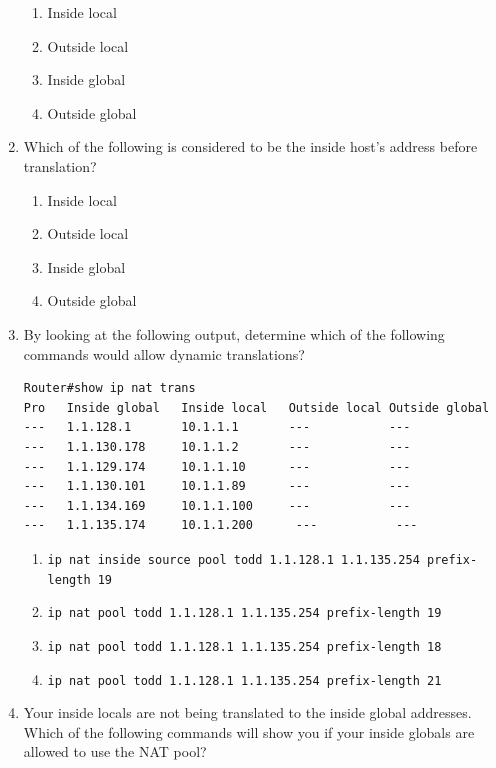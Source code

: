 \documentclass[b5paper,11pt]{memoir}
\begin{document}
\begin{enumerate}
  \begin{enumerate}
  \tightlist
  \item
    Inside local
  \item
    Outside local
  \item
    Inside global
  \item
    Outside global
  \end{enumerate}
\item
  Which of the following is considered to be the inside host's address
  before translation?

  \begin{enumerate}
  \tightlist
  \item
    Inside local
  \item
    Outside local
  \item
    Inside global
  \item
    Outside global
  \end{enumerate}
\item
  By looking at the following output, determine which of the following
  commands would allow dynamic translations?

\begin{verbatim}
Router#show ip nat trans
Pro   Inside global   Inside local   Outside local Outside global
---   1.1.128.1       10.1.1.1       ---           ---
---   1.1.130.178     10.1.1.2       ---           ---
---   1.1.129.174     10.1.1.10      ---           ---
---   1.1.130.101     10.1.1.89      ---           ---
---   1.1.134.169     10.1.1.100     ---           ---
---   1.1.135.174     10.1.1.200      ---           ---
\end{verbatim}

  \begin{enumerate}
  \tightlist
  \item
    \texttt{ip\ nat\ inside\ source\ pool\ todd\ 1.1.128.1\ 1.1.135.254\ prefix-length\ 19}
  \item
    \texttt{ip\ nat\ pool\ todd\ 1.1.128.1\ 1.1.135.254\ prefix-length\ 19}
  \item
    \texttt{ip\ nat\ pool\ todd\ 1.1.128.1\ 1.1.135.254\ prefix-length\ 18}
  \item
    \texttt{ip\ nat\ pool\ todd\ 1.1.128.1\ 1.1.135.254\ prefix-length\ 21}
  \end{enumerate}
\item
  Your inside locals are not being translated to the inside global
  addresses. Which of the following commands will show you if your
  inside globals are allowed to use the NAT pool?


\end{enumerate}
\end{document}
